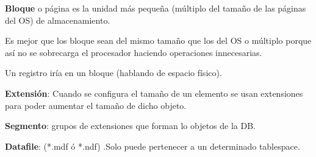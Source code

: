 \documentclass{article}
\begin{document}
\textbf{Bloque} o página es la unidad más pequeña (múltiplo del tamaño de las
páginas del OS) de almacenamiento.

Es mejor que los bloque sean del mismo tamaño que los del OS o múltiplo porque
así no se sobrecarga el procesador haciendo operaciones innecesarias.

Un registro iría en un bloque (hablando de espacio físico).

\textbf{Extensión}: Cuando se configura el tamaño de un elemento se usan
extensiones para poder aumentar el tamaño de dicho objeto.

\textbf{Segmento}: grupos de extensiones que forman lo objetos de la DB.

\textbf{Datafile}: (*.mdf ó *.ndf) .Solo puede pertenecer a un determinado
tablespace.
\end{document}

